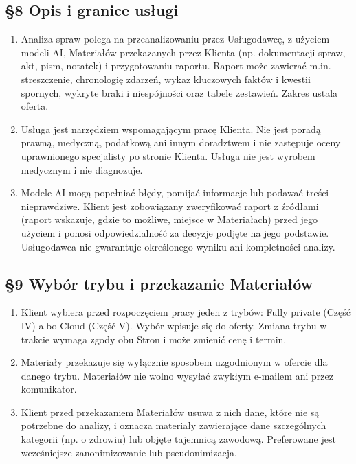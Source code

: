 \documentclass[11pt,a4paper]{article}
\begin{document}
\subsection*{§8 Opis i granice usługi}
\begin{enumerate}
\item Analiza spraw polega na przeanalizowaniu przez Usługodawcę, z użyciem modeli AI, Materiałów przekazanych przez Klienta (np. dokumentacji spraw, akt, pism, notatek) i przygotowaniu raportu. Raport może zawierać m.in. streszczenie, chronologię zdarzeń, wykaz kluczowych faktów i kwestii spornych, wykryte braki i niespójności oraz tabele zestawień. Zakres ustala oferta.
\item Usługa jest narzędziem wspomagającym pracę Klienta. Nie jest poradą prawną, medyczną, podatkową ani innym doradztwem i nie zastępuje oceny uprawnionego specjalisty po stronie Klienta. Usługa nie jest wyrobem medycznym i nie diagnozuje.
\item Modele AI mogą popełniać błędy, pomijać informacje lub podawać treści nieprawdziwe. Klient jest zobowiązany zweryfikować raport z źródłami (raport wskazuje, gdzie to możliwe, miejsce w Materiałach) przed jego użyciem i ponosi odpowiedzialność za decyzje podjęte na jego podstawie. Usługodawca nie gwarantuje określonego wyniku ani kompletności analizy.
\end{enumerate}

\subsection*{§9 Wybór trybu i przekazanie Materiałów}
\begin{enumerate}
\item Klient wybiera przed rozpoczęciem pracy jeden z trybów: Fully private (Część IV) albo Cloud (Część V). Wybór wpisuje się do oferty. Zmiana trybu w trakcie wymaga zgody obu Stron i może zmienić cenę i termin.
\item Materiały przekazuje się wyłącznie sposobem uzgodnionym w ofercie dla danego trybu. Materiałów nie wolno wysyłać zwykłym e-mailem ani przez komunikator.
\item Klient przed przekazaniem Materiałów usuwa z nich dane, które nie są potrzebne do analizy, i oznacza materiały zawierające dane szczególnych kategorii (np. o zdrowiu) lub objęte tajemnicą zawodową. Preferowane jest wcześniejsze zanonimizowanie lub pseudonimizacja.
\end{enumerate}
\end{document}
